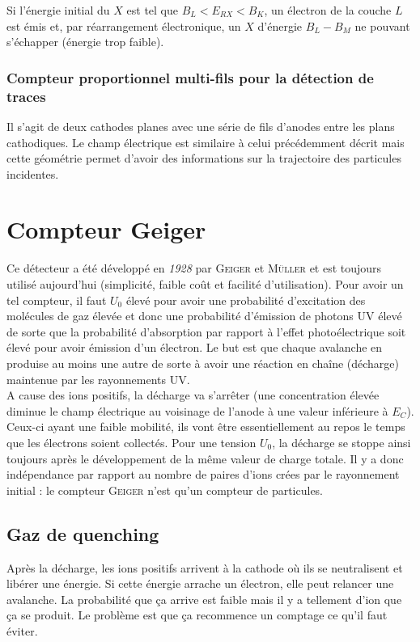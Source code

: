 Si l'énergie initial du $X$ est tel que $B_L<E_{RX}<B_K$, un électron de la couche $L$ est émis
et, par réarrangement électronique, un $X$ d'énergie $B_L-B_M$ ne pouvant s'échapper (énergie
trop faible). 
	
\subsubsection{Compteur proportionnel multi-fils pour la détection de traces}
Il s'agit de deux cathodes planes avec une série de fils d'anodes entre les plans cathodiques. Le 
champ électrique est similaire à celui précédemment décrit mais cette géométrie permet d'avoir des
informations sur la trajectoire des particules incidentes.
	
	
\section{Compteur Geiger}%
Ce détecteur a été développé en \textit{1928} par \textsc{Geiger} et \textsc{Müller} et est toujours
utilisé aujourd'hui (simplicité, faible coût et facilité d'utilisation). Pour avoir un tel 
compteur, il faut $U_0$ élevé pour avoir une probabilité d'excitation des molécules de gaz élevée
et donc une probabilité d'émission de photons UV élevé de sorte que la probabilité d'absorption 
par rapport à l'effet photoélectrique soit élevé pour avoir émission d'un électron. Le but est
que chaque avalanche en produise au moins une autre de sorte à avoir une réaction en chaîne (décharge)
maintenue par les rayonnements UV.\\

A cause des ions positifs, la décharge va s'arrêter (une concentration élevée diminue le champ 
électrique au voisinage de l'anode à une valeur inférieure à $E_C$). Ceux-ci ayant une faible
mobilité, ils vont être essentiellement au repos le temps que les électrons soient collectés. Pour
une tension $U_0$, la décharge se stoppe ainsi toujours après le développement de la même valeur de
charge totale. Il y a donc indépendance par rapport au nombre de paires d'ions crées par le 
rayonnement initial : le compteur \textsc{Geiger} n'est qu'un compteur de particules.
	
	
	
\subsection{Gaz de quenching}%
Après la décharge, les ions positifs arrivent à la cathode où ils se neutralisent et libérer une
énergie. Si cette énergie arrache un électron, elle peut relancer une avalanche. La probabilité que
ça arrive est faible mais il y a tellement d'ion que ça se produit. Le problème est que ça recommence
un comptage ce qu'il faut éviter.\\

